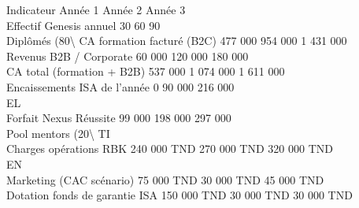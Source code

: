 \documentclass[12pt,landscape,a4paper]{article}
\begin{document}
\vspace{0.5em}
Indicateur                                 Année 1          Année 2          Année 3\\
Effectif Genesis annuel                          30              60               90\\
Diplômés (80\textbackslash{}%
CA formation facturé (B2C)                  477 000          954 000        1 431 000\\
Revenus B2B / Corporate                      60 000          120 000          180 000\\
CA total (formation + B2B)                  537 000        1 074 000        1 611 000\\
Encaissements ISA de l’année                         0        90 000          216 000\\
\vspace{0.5em}
\vspace{0.5em}
\vspace{0.5em}
\vspace{0.5em}
EL\\
Forfait Nexus Réussite                       99 000          198 000          297 000\\
Pool mentors (20\textbackslash{}%
\vspace{0.5em}
\vspace{0.5em}
\vspace{0.5em}
\vspace{0.5em}
TI\\
Charges opérations RBK                 240 000 TND       270 000 TND   320 000 TND\\
\vspace{0.5em}
\vspace{0.5em}
\vspace{0.5em}
\vspace{0.5em}
EN\\
Marketing (CAC scénario)                75 000 TND        30 000 TND       45 000 TND\\
Dotation fonds de garantie ISA         150 000 TND        30 000 TND       30 000 TND\\
\vspace{0.5em}
\vspace{0.5em}
\vspace{0.5em}
\vspace{0.5em}
\end{document}
